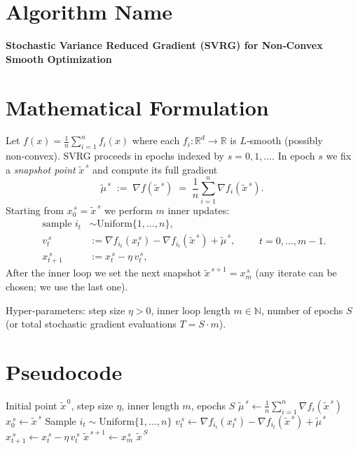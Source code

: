 \documentclass{article}
\newcommand{\RR}{\mathbb{R}}
\newcommand{\grad}{\nabla}
\begin{document}
\section*{Algorithm Name}
\textbf{Stochastic Variance Reduced Gradient (SVRG) for Non‑Convex Smooth Optimization}

\section*{Mathematical Formulation}
Let $f(x)=\frac{1}{n}\sum_{i=1}^{n}f_i(x)$ where each $f_i:\RR^d\rightarrow\RR$ is $L$‑smooth (possibly non‑convex).  
SVRG proceeds in epochs indexed by $s=0,1,\dots$. In epoch $s$ we fix a \emph{snapshot point} $\tilde{x}^{\,s}$ and compute its full gradient
\[
\tilde{\mu}^{\,s} \;:=\; \grad f(\tilde{x}^{\,s}) \;=\; \frac{1}{n}\sum_{i=1}^{n}\grad f_i(\tilde{x}^{\,s}).
\]
Starting from $x_{0}^{\,s}=\tilde{x}^{\,s}$ we perform $m$ inner updates:
\[
\begin{aligned}
\text{sample }i_t &\sim \text{Uniform}\{1,\dots,n\},\\
v_t^{\,s} &:= \grad f_{i_t}(x_t^{\,s})-\grad f_{i_t}(\tilde{x}^{\,s})+\tilde{\mu}^{\,s},\\
x_{t+1}^{\,s} &:= x_t^{\,s}-\eta\,v_t^{\,s},
\end{aligned}
\qquad t=0,\dots,m-1 .
\]
After the inner loop we set the next snapshot $\tilde{x}^{\,s+1}=x_{m}^{\,s}$ (any iterate can be chosen; we use the last one).  

Hyper‑parameters: step size $\eta>0$, inner loop length $m\in\mathbb{N}$, number of epochs $S$ (or total stochastic gradient evaluations $T=S\cdot m$).

\section*{Pseudocode}
\begin{algorithm}[H]
\caption{SVRG for Non‑Convex $f(x)=\frac1n\sum_{i=1}^n f_i(x)$}
\begin{algorithmic}[1]
\Require Initial point $\tilde{x}^{\,0}$, step size $\eta$, inner length $m$, epochs $S$
    \State $\tilde{\mu}^{\,s}\gets \frac1n\sum_{i=1}^{n}\grad f_i(\tilde{x}^{\,s})$   
    \State $x_0^{\,s}\gets \tilde{x}^{\,s}$
        \State Sample $i_t\sim\text{Uniform}\{1,\dots,n\}$
        \State $v_t^{\,s}\gets \grad f_{i_t}(x_t^{\,s})-\grad f_{i_t}(\tilde{x}^{\,s})+\tilde{\mu}^{\,s}$
        \State $x_{t+1}^{\,s}\gets x_t^{\,s}-\eta\,v_t^{\,s}$
    \EndFor
    \State $\tilde{x}^{\,s+1}\gets x_{m}^{\,s}$   
\EndFor
\State \Return $\tilde{x}^{\,S}$
\end{algorithmic}
\end{algorithm}
\end{document}
